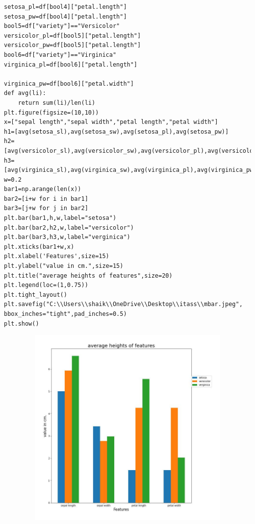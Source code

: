 \documentclass[12pt,a4paper]{article}
\begin{document}
\begin{verbatim}
setosa_pl=df[bool4]["petal.length"]
setosa_pw=df[bool4]["petal.length"]
bool5=df["variety"]=="Versicolor"
versicolor_pl=df[bool5]["petal.length"]
versicolor_pw=df[bool5]["petal.length"]
bool6=df["variety"]=="Virginica"
virginica_pl=df[bool6]["petal.length"]

virginica_pw=df[bool6]["petal.width"]
def avg(li):
    return sum(li)/len(li)
plt.figure(figsize=(10,10))
x=["sepal length","sepal width","petal length","petal width"]
h1=[avg(setosa_sl),avg(setosa_sw),avg(setosa_pl),avg(setosa_pw)]
h2=[avg(versicolor_sl),avg(versicolor_sw),avg(versicolor_pl),avg(versicolor_pw)]
h3=[avg(virginica_sl),avg(virginica_sw),avg(virginica_pl),avg(virginica_pw)]
w=0.2
bar1=np.arange(len(x))
bar2=[i+w for i in bar1]
bar3=[j+w for j in bar2]
plt.bar(bar1,h,w,label="setosa")
plt.bar(bar2,h2,w,label="versicolor")
plt.bar(bar3,h3,w,label="verginica")
plt.xticks(bar1+w,x)
plt.xlabel('Features',size=15)
plt.ylabel("value in cm.",size=15)
plt.title("average heights of features",size=20)
plt.legend(loc=(1,0.75))
plt.tight_layout()
plt.savefig("C:\\Users\\shaik\\OneDrive\\Desktop\\itass\\mbar.jpeg", bbox_inches="tight",pad_inches=0.5)
plt.show()
\end{verbatim}
\includegraphics[width=15cm,height=10cm]{mbar.jpeg}
\end{document}
